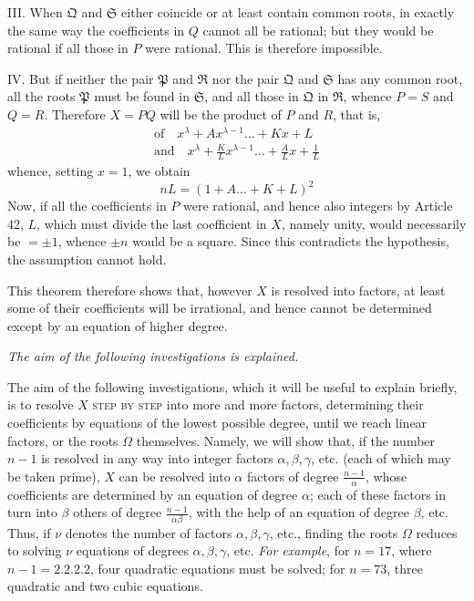 III. When \(\mathfrak Q\) and \(\mathfrak S\) either coincide or at least contain common roots, in exactly the same way the coefficients in \(Q\) cannot all be rational; but they would be rational if all those in \(P\) were rational. This is therefore impossible.

IV. But if neither the pair \(\mathfrak P\) and \(\mathfrak R\) nor the pair \(\mathfrak Q\) and \(\mathfrak S\) has any common
root, all the roots \(\mathfrak P\) must be found in \(\mathfrak S\), and all those in \(\mathfrak Q\) in \(\mathfrak R\), whence \(P=S\) and \(Q=R\). Therefore \(X=PQ\) will be the product of \(P\) and \(R\), that is, \[\begin{gathered}
\text{of}\quad x^\lambda+Ax^{\lambda-1}\ldots+Kx+L\\
\text{and}\quad x^\lambda+\frac KLx^{\lambda-1}\ldots+\frac ALx+\frac1L
\end{gathered}\] whence, setting \(x=1\), we obtain \[nL=(1+A\ldots+K+L)^2\] Now, if all the coefficients in \(P\) were rational, and hence also integers by Article 42, \(L\), which must divide the last coefficient in \(X\), namely unity, would necessarily be \(=\pm1\), whence \(\pm n\) would be a square. Since this contradicts the hypothesis, the assumption cannot hold.

This theorem therefore shows that, however \(X\) is resolved into factors, at least some of their coefficients will be irrational, and hence cannot be determined except by an equation of higher degree.

\begin{center}\textit{The aim of the following investigations is explained.}\end{center}


The aim of the following investigations, which it will be useful to explain briefly, is to resolve \(X\) \textsc{step by step} into more and more factors, determining their coefficients by equations of the lowest possible degree, until we reach linear factors, or the roots \(\Omega\) themselves. Namely, we will show that, if the number \(n-1\) is resolved in any way into integer factors \(\alpha,\allowbreak \beta,\allowbreak \gamma\), etc. (each of which may be taken prime), \(X\) can be resolved into \(\alpha\) factors of degree \(\frac{n-1}{\alpha}\), whose coefficients are determined by an equation of degree \(\alpha\); each of these factors in turn into \(\beta\) others of degree \(\frac{n-1}{\alpha\beta}\), with the help of an equation of degree \(\beta\), etc. Thus, if \(\nu\) denotes the number of factors \(\alpha,\allowbreak \beta,\allowbreak \gamma\), etc., finding the roots \(\Omega\) reduces to solving \(\nu\) equations of degrees \(\alpha,\allowbreak \beta,\allowbreak \gamma\), etc. \textit{For example}, for \(n=17\), where \(n-1=2.2.2.2\), four quadratic equations must be solved; for \(n=73\), three quadratic and two cubic equations.

